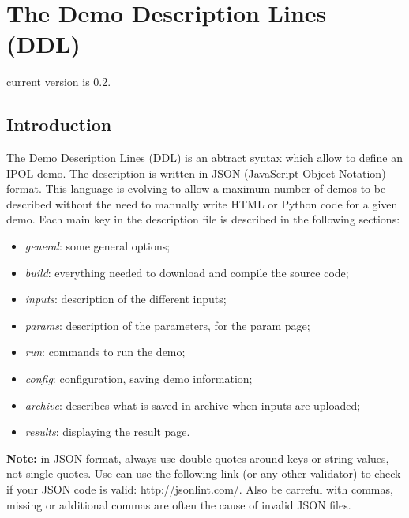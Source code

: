 \section{The Demo Description Lines (DDL)}

current version is 0.2.

\subsection{Introduction}
The Demo Description Lines (DDL) is an abtract syntax which allow to
define an IPOL demo. The description is 
written in JSON (JavaScript Object Notation) format. This language is
evolving to allow a maximum number of demos to be described without the
need to manually write HTML or Python code 
for a given demo. Each main key in the description file is described
in the following sections:
\begin{itemize}
  \item \textit{general}: some general options;
  \item \textit{build}: everything needed to download and compile the source code;
  \item \textit{inputs}: description of the different inputs;
  \item \textit{params}: description of the parameters, for the param page;
  \item \textit{run}: commands to run the demo;
  \item \textit{config}: configuration, saving demo information;
  \item \textit{archive}: describes what is saved in archive when inputs are uploaded;
  \item \textit{results}: displaying the result page.
\end{itemize}



{\bf Note:} in JSON format, always use double quotes around keys or string 
values, not single quotes. Use can use the following link (or any other validator)
to check if your JSON code is valid: http://jsonlint.com/.
Also be carreful with commas, missing or additional commas are often the cause of
invalid JSON files.


